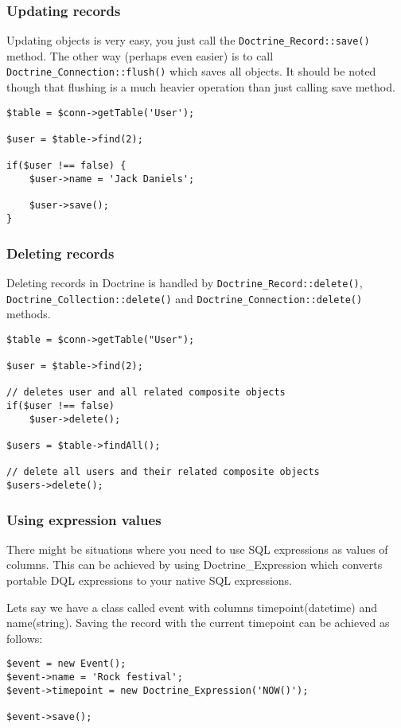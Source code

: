 \documentclass[11pt,a4paper]{report}
\begin{document}
\subsubsection{Updating records}
Updating objects is very easy, you just call the \texttt{Doctrine\_Record::save()} method. The other way (perhaps even easier) is to call \texttt{Doctrine\_Connection::flush()} which saves all objects. It should be noted though that flushing is a much heavier operation than just calling save method.

\begin{verbatim}
$table = $conn->getTable('User');

$user = $table->find(2);

if($user !== false) {
    $user->name = 'Jack Daniels';

    $user->save();
}
\end{verbatim}

\subsubsection{Deleting records}
Deleting records in Doctrine is handled by \texttt{Doctrine\_Record::delete()}, \texttt{Doctrine\_Collection::delete()} and \texttt{Doctrine\_Connection::delete()} methods.

\begin{verbatim}
$table = $conn->getTable("User");

$user = $table->find(2);

// deletes user and all related composite objects
if($user !== false)
    $user->delete();

$users = $table->findAll();

// delete all users and their related composite objects
$users->delete();
\end{verbatim}

\subsubsection{Using expression values}
There might be situations where you need to use SQL expressions as values of columns. This can be achieved by using Doctrine\_Expression which converts portable DQL expressions to your native SQL expressions.

Lets say we have a class called event with columns timepoint(datetime) and name(string). Saving the record with the current timepoint can be achieved as follows:

\begin{verbatim}
$event = new Event();
$event->name = 'Rock festival';
$event->timepoint = new Doctrine_Expression('NOW()');

$event->save();
\end{verbatim}
\end{document}
